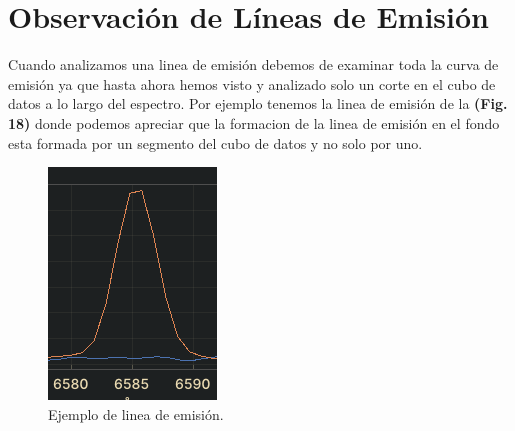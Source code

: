 \documentclass[9pt,twocolumn,a4paper]{opticajnl}
\begin{document}
\section*{Observación de Líneas de Emisión}
Cuando analizamos una linea de emisión debemos de examinar toda la curva de emisión ya que hasta ahora hemos visto y analizado solo un corte en el cubo de datos a lo largo del espectro. Por ejemplo tenemos la linea de emisión de la \textbf{(Fig. 18)} donde podemos apreciar que la formacion de la linea de emisión en el fondo esta formada por un segmento del cubo de datos y no solo por uno.

\begin{figure}
    \centering
    \includegraphics[width=0.5\linewidth]{emisionLine1.png}
    \caption{Ejemplo de linea de emisión.}
    \label{fig:moreinfo}
\end{figure}

\newpage
\end{document}
